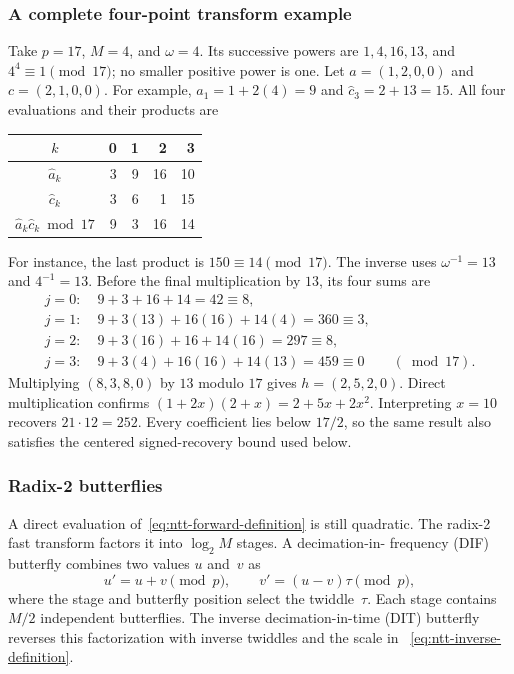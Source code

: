 \subsubsection{A complete four-point transform example}
\label{subsec:ntt-worked-example}

Take $p=17$, $M=4$, and $\omega=4$.  Its successive powers are
$1,4,16,13$, and $4^4\equiv1\pmod{17}$; no smaller positive power is
one.  Let $a=(1,2,0,0)$ and $c=(2,1,0,0)$.  For example,
$\widehat a_1=1+2(4)=9$ and
$\widehat c_3=2+13=15$.  All four evaluations and their products are
\begin{center}
\begin{tabular}{c|rrrr}
$k$ & 0 & 1 & 2 & 3 \\
\hline
$\widehat a_k$ & 3 & 9 & 16 & 10 \\
$\widehat c_k$ & 3 & 6 & 1 & 15 \\
$\widehat a_k\widehat c_k\bmod17$ & 9 & 3 & 16 & 14
\end{tabular}
\end{center}
For instance, the last product is $150\equiv14\pmod{17}$.
The inverse uses $\omega^{-1}=13$ and $4^{-1}=13$.  Before the final
multiplication by $13$, its four sums are
\begin{align*}
j=0:\;&9+3+16+14=42\equiv8,\\
j=1:\;&9+3(13)+16(16)+14(4)=360\equiv3,\\
j=2:\;&9+3(16)+16+14(16)=297\equiv8,\\
j=3:\;&9+3(4)+16(16)+14(13)=459\equiv0
\qquad(\bmod17).
\end{align*}
Multiplying $(8,3,8,0)$ by $13$ modulo $17$ gives
$h=(2,5,2,0)$.  Direct multiplication confirms
$(1+2x)(2+x)=2+5x+2x^2$.  Interpreting $x=10$ recovers
$21\cdot12=252$.  Every coefficient lies below $17/2$, so the same
result also satisfies the centered signed-recovery bound used below.

\subsubsection{Radix-2 butterflies}

A direct evaluation of~\eqref{eq:ntt-forward-definition} is still quadratic.
The radix-2 fast transform factors it into $\log_2 M$ stages.  A decimation-in-
frequency (DIF) butterfly combines two values $u$ and~$v$ as
\begin{equation}
  u' = u+v\pmod p,
  \qquad
  v' = (u-v)\tau\pmod p,
  \label{eq:ntt-dif-butterfly}
\end{equation}
where the stage and butterfly position select the twiddle~$\tau$.  Each stage
contains $M/2$ independent butterflies.  The inverse decimation-in-time (DIT)
butterfly reverses this factorization with inverse twiddles and the scale in
~\eqref{eq:ntt-inverse-definition}.

